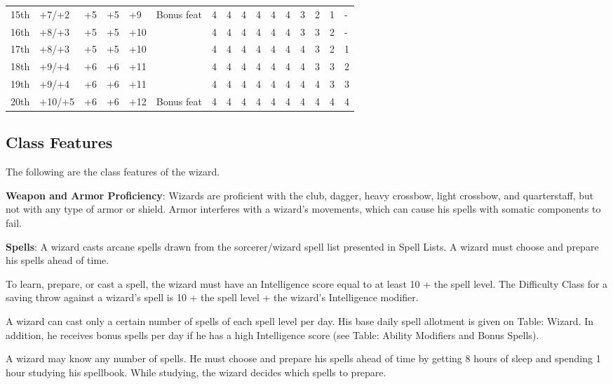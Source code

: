\begin{table*}[]
\begin{tabularx}{\linewidth}{lp{6em}p{2.5em}p{2.5em}p{2.5em}Xllllllllll}
15th & +7/+2 & +5 & +5 & +9 & Bonus feat & 4 & 4 & 4 & 4 & 4 & 4 & 3 & 2 & 1 & -\\
16th & +8/+3 & +5 & +5 & +10 &  & 4 & 4 & 4 & 4 & 4 & 4 & 3 & 3 & 2 & -\\
17th & +8/+3 & +5 & +5 & +10 &  & 4 & 4 & 4 & 4 & 4 & 4 & 4 & 3 & 2 & 1\\
18th & +9/+4 & +6 & +6 & +11 &  & 4 & 4 & 4 & 4 & 4 & 4 & 4 & 3 & 3 & 2\\
19th & +9/+4 & +6 & +6 & +11 &  & 4 & 4 & 4 & 4 & 4 & 4 & 4 & 4 & 3 & 3\\
20th & +10/+5 & +6 & +6 & +12 & Bonus feat & 4 & 4 & 4 & 4 & 4 & 4 & 4 & 4 & 4 & 4\\
\end{tabularx}
\end{table*}
				
\subsection{Class Features}

				
The following are the class features of the wizard.
				
\textbf{Weapon and Armor Proficiency}: Wizards are proficient with the club, dagger, heavy crossbow, light crossbow, and quarterstaff, but not with any type of armor or shield. Armor interferes with a wizard's movements, which can cause his spells with somatic components to fail.
				
\textbf{Spells}: A wizard casts arcane spells drawn from the sorcerer/wizard spell list presented in Spell Lists. A wizard must choose and prepare his spells ahead of time.
				
To learn, prepare, or cast a spell, the wizard must have an Intelligence score equal to at least 10 + the spell level. The Difficulty Class for a saving throw against a wizard's spell is 10 + the spell level + the wizard's Intelligence modifier.
				
A wizard can cast only a certain number of spells of each spell level per day. His base daily spell allotment is given on Table: Wizard. In addition, he receives bonus spells per day if he has a high Intelligence score (see Table: Ability Modifiers and Bonus Spells).
				
A wizard may know any number of spells. He must choose and prepare his spells ahead of time by getting 8 hours of sleep and spending 1 hour studying his spellbook. While studying, the wizard decides which spells to prepare.
				
